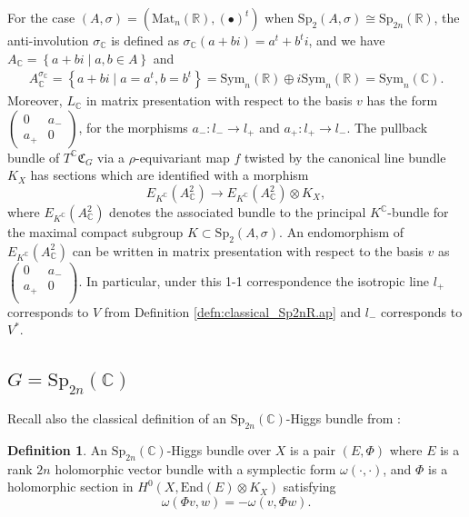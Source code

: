 \documentclass[oneside,11pt]{amsart}
\theoremstyle{definition}
\newtheorem{defn}[thm]{Definition}
\theoremstyle{remark}
\numberwithin{thm}{section}
\numberwithin{equation}{section}
\begin{document}
For the case $(A,\sigma)=(\mathrm{Mat}_{n}(\mathbb{R}),(\bullet)^t)$ when $\mathrm{Sp}_2(A,\sigma) \cong  \mathrm{Sp}_{2n}(\mathbb{R})$, the anti-involution ${{\sigma }_{\mathbb{C}}}$ is defined as ${{\sigma }_{\mathbb{C}}}\left( a+bi \right)={{a}^{t}}+{b^{t}}i$, and we have 
${A}_{\mathbb{C}}=\left\{ a+bi\mid a,b\in A \right\}$ 
and 
\begin{align*}	
A_{\mathbb{C}}^{{{\sigma }_{\mathbb{C}}}} =\left\{ a+bi \mid a={{a}^{t}},b={{b}^{t}} \right\}=  \mathrm{Sym}_n\left(\mathbb{R} \right)\oplus i\mathrm{Sym}_n(\mathbb{R})=\mathrm{Sym}_n(\mathbb C).
\end{align*}
Moreover, $L_\mathbb C$ in matrix presentation with respect to the basis $v$  has the form $\begin{pmatrix}
    0 & a_- \\
    a_+ & 0
\end{pmatrix}$, 
for the morphisms $a_{-}\colon l_{-} \to l_{+}$ and $a_{+}\colon l_{+} \to l_{-}$. The pullback bundle of $T^{\mathbb C}\mathfrak{C}_G$ via a $\rho$-equivariant map $f$ twisted by the canonical line bundle $K_X$ has sections which are
identified with a morphism 
\[E_{K^{\mathbb{C}}}(A^2_{\mathbb{C}})\to E_{K^{\mathbb{C}}}(A^2_{\mathbb{C}})\otimes K_X,\]
where $E_{K^{\mathbb{C}}}(A^2_{\mathbb{C}})$ denotes the associated bundle to the principal $K^{\mathbb{C}}$-bundle for the maximal compact subgroup $K \subset \mathrm{Sp}_2(A, \sigma)$. An endomorphism of $E_{K^{\mathbb{C}}}(A^2_{\mathbb{C}})$ can be written in matrix presentation with respect to the basis $v$ as $\left( \begin{matrix}
   0 & a_{-}   \\
   a_{+}  & 0  \\
\end{matrix} \right)$. In particular, under this 1-1 correspondence the isotropic line $l_{+}$ corresponds to $V$ from Definition \ref{defn:classical_Sp2nR.ap} and $l_{-}$ corresponds to $V^*$.

\subsection{\texorpdfstring{$G=\mathrm{Sp}_{2n}(\mathbb{C})$}{G=Sp(2n,C)}}

Recall also the classical definition of an $\mathrm{Sp}_{2n}( \mathbb{C})$-Higgs bundle from \cite[Section 3.5]{GGM}:

\begin{defn}\label{defn:class_Sp_2nC}
    An $\mathrm{Sp}_{2n}( \mathbb{C})$-Higgs bundle over $X$ is a pair $(E, \Phi)$ where $E$ is a rank $2n$ holomorphic vector bundle with a symplectic form $\omega (\cdot, \cdot)$, and $\Phi$ is a holomorphic section in $H^0(X, \mathrm{End}(E)\otimes K_X)$ satisfying
    \[\omega(\Phi v,w)=-\omega(v,\Phi w).\]
\end{defn}
\end{document}
